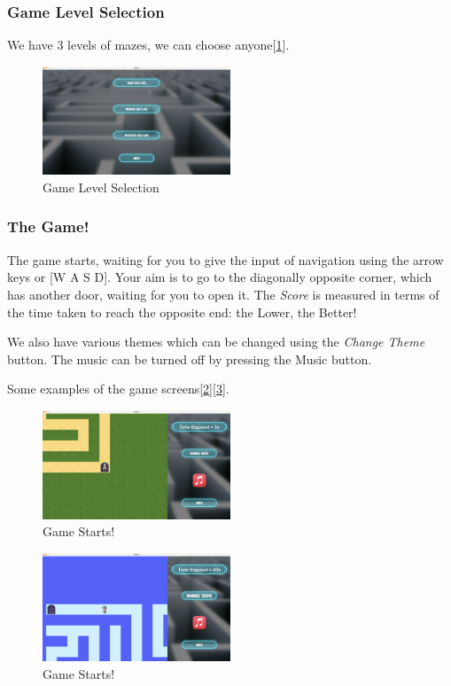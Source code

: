\documentclass[10pt]{article}
\begin{document}
    \subsubsection{Game Level Selection}
    We have 3 levels of mazes, we can choose anyone[\ref{fig:GameLevel}].
    \begin{figure}[h!]
        \centering
        \includegraphics[width=0.5\textwidth]{GameLevel}
        \caption{Game Level Selection}\label{fig:GameLevel}
    \end{figure}

    \subsubsection{The Game!}
    The game starts, waiting for you to give the input of navigation using the arrow keys or [W A S D].
    Your aim is to go to the diagonally opposite corner, which has another door, waiting for you to open it.
    The \emph{Score} is measured in terms of the time taken to reach the opposite end: the Lower, the Better!

    We also have various themes which can be changed using the \emph{Change Theme} button.
    The music can be turned off by pressing the Music button.

    Some examples of the game screens[\ref{fig:GameStart}][\ref{fig:GamePlay}].
    \begin{figure}[h!]
        \centering
        \includegraphics[width=0.5\textwidth]{MazeGame}
        \caption{Game Starts!}\label{fig:GameStart}
    \end{figure}
    \begin{figure}[h!]
        \centering
        \includegraphics[width=0.5\textwidth]{MazeGameThemes}
        \caption{ Game Starts!}\label{fig:GamePlay}
    \end{figure}
\end{document}
